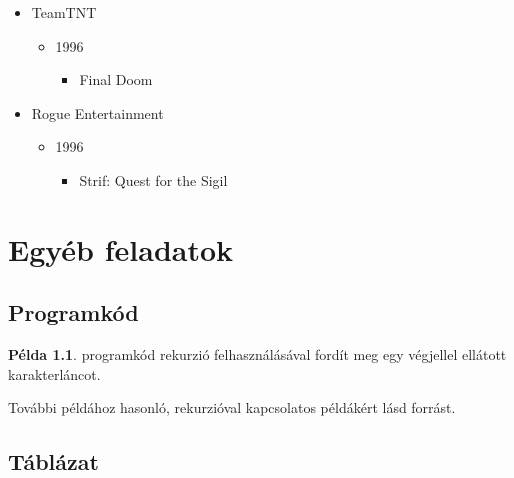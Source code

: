 \documentclass{thesis-ekf}
\theoremstyle{definition}
\newtheorem{pelda}{Példa}[chapter]
\begin{document}
\begin{itemize}
    \item TeamTNT
        \begin{itemize}
            \item 1996
                \begin{itemize}
                    \item Final Doom
                \end{itemize}
        \end{itemize}
    \item Rogue Entertainment
        \begin{itemize}
            \item 1996
                \begin{itemize}
                    \item Strif: Quest for the Sigil
                \end{itemize}
        \end{itemize}
\end{itemize}
\cite[A motort használó játékok]{doomengine}

\chapter{Egyéb feladatok}

\section{Programkód}


\begin{pelda}
     programkód rekurzió felhasználásával fordít meg egy
    végjellel ellátott karakterláncot.
    \label{pld:rstrrev}
\end{pelda}

További  példához hasonló, rekurzióval kapcsolatos példákért
lásd  forrást.

\section{Táblázat}
\end{document}
